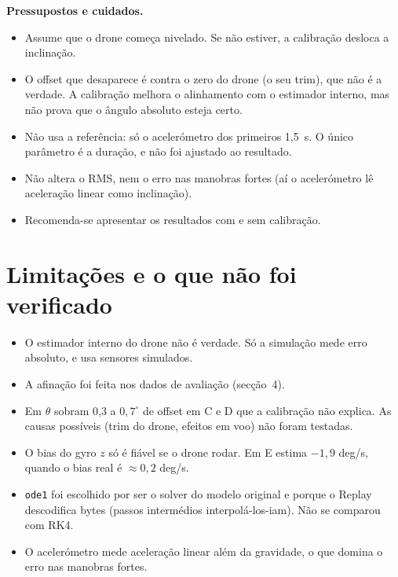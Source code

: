 \documentclass[10pt,a4paper]{article}
\newcommand{\code}[1]{\texttt{#1}}
\begin{document}
\begin{caveat}
\textbf{Pressupostos e cuidados.}
\begin{itemize}
  \item Assume que o drone come\c{c}a nivelado. Se n\~ao estiver, a calibra\c{c}\~ao desloca a inclina\c{c}\~ao.
  \item O offset que desaparece \'e contra o zero do drone (o seu trim), que n\~ao \'e a verdade. A calibra\c{c}\~ao melhora o alinhamento com o estimador interno, mas n\~ao prova que o \^angulo absoluto esteja certo.
  \item N\~ao usa a refer\^encia: s\'o o aceler\'ometro dos primeiros 1,5~s. O \'unico par\^ametro \'e a dura\c{c}\~ao, e n\~ao foi ajustado ao resultado.
  \item N\~ao altera o RMS, nem o erro nas manobras fortes (a\'i o aceler\'ometro l\^e acelera\c{c}\~ao linear como inclina\c{c}\~ao).
  \item Recomenda-se apresentar os resultados com e sem calibra\c{c}\~ao.
\end{itemize}
\end{caveat}

\section{Limita\c{c}\~oes e o que n\~ao foi verificado}

\begin{itemize}
  \item O estimador interno do drone n\~ao \'e verdade. S\'o a simula\c{c}\~ao mede erro absoluto, e usa sensores simulados.
  \item A afina\c{c}\~ao foi feita nos dados de avalia\c{c}\~ao (sec\c{c}\~ao~4).
  \item Em $\theta$ sobram 0,3 a $0{,}7^\circ$ de offset em C e D que a calibra\c{c}\~ao n\~ao explica. As causas poss\'iveis (trim do drone, efeitos em voo) n\~ao foram testadas.
  \item O bias do gyro $z$ s\'o \'e fi\'avel se o drone rodar. Em E estima $-1{,}9$ deg/s, quando o bias real \'e $\approx 0{,}2$ deg/s.
  \item \code{ode1} foi escolhido por ser o solver do modelo original e porque o Replay descodifica bytes (passos interm\'edios interpol\'a-los-iam). N\~ao se comparou com RK4.
  \item O aceler\'ometro mede acelera\c{c}\~ao linear al\'em da gravidade, o que domina o erro nas manobras fortes.
\end{itemize}
\end{document}
